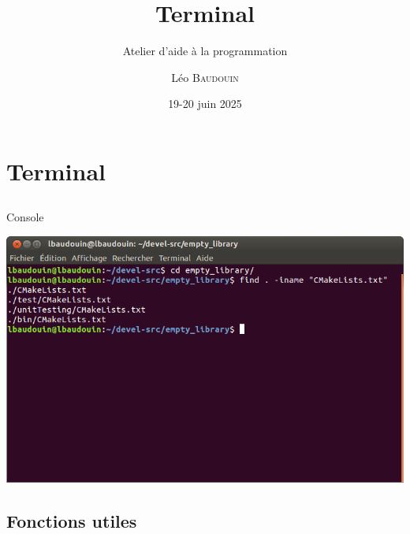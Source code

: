\documentclass{beamer}
\title{Terminal}
\subtitle{Atelier d'aide à la programmation}
\author{L\'eo \textsc{Baudouin}}
\institute{
  {\url{baudouin.leo @ gmail.com}}
}
\date{19-20 juin 2025}
\begin{document}
\begin{frame}
  \titlepage
\end{frame}


\section{Terminal}

\subsection{}

\begin{frame}{Console}

\includegraphics[width=\linewidth]{images/terminal-exemple}

\end{frame}

\subsection{Fonctions utiles}
\end{document}
